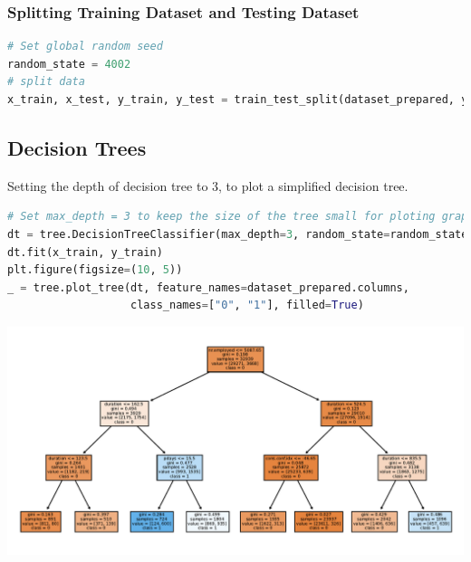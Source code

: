 \documentclass[11pt,a4paper]{article}
\begin{document}
    
    \subsubsection{Splitting Training Dataset and Testing Dataset}
\begin{lstlisting}[language = Python]
# Set global random seed
random_state = 4002
# split data
x_train, x_test, y_train, y_test = train_test_split(dataset_prepared, y, test_size=0.2, random_state=random_state)
\end{lstlisting}
    
    
    \subsection{Decision Trees} \label{decision_trees}
    Setting the depth of decision tree to 3, to plot a simplified decision tree.
\begin{lstlisting}[language = Python]
# Set max_depth = 3 to keep the size of the tree small for ploting graph
dt = tree.DecisionTreeClassifier(max_depth=3, random_state=random_state)
dt.fit(x_train, y_train)
plt.figure(figsize=(10, 5))
_ = tree.plot_tree(dt, feature_names=dataset_prepared.columns,
                   class_names=["0", "1"], filled=True)
\end{lstlisting}
    \begin{center}
        \includegraphics[width=.9\textwidth]{plot/classification/decision_tree.pdf}
    \end{center}
    
\end{document}
